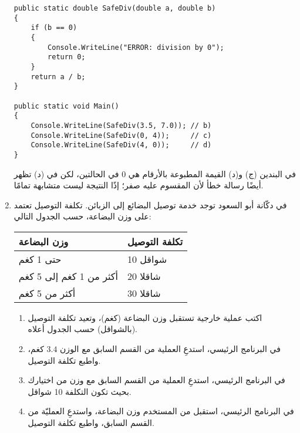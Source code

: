 \documentclass[14pt]{extarticle}
\begin{document}
\begin{enumerate}[itemsep=3em]
\ifwithsols
\begin{boxSolution}
\begin{english}
\begin{verbatim}
public static double SafeDiv(double a, double b)
{
    if (b == 0)
    {
        Console.WriteLine("ERROR: division by 0");
        return 0;
    }
    return a / b;
}

public static void Main()
{
    Console.WriteLine(SafeDiv(3.5, 7.0)); // b)
    Console.WriteLine(SafeDiv(0, 4));     // c)
    Console.WriteLine(SafeDiv(4, 0));     // d)
}
\end{verbatim}
\end{english}
\par
في البندين (ج) و(د) القيمة المطبوعة بالأرقام هي 0 في الحالتين، لكن في (د) تظهر أيضًا رسالة خطأ لأن المقسوم عليه صفر؛ إذًا النتيجة ليست متشابهة تمامًا.
\end{boxSolution}
\fi

\clearpage
\item
في دكّانة أبو السعود توجد خدمة توصيل البضائع إلى الزبائن. تكلفة التوصيل تعتمد على وزن البضاعة، حسب الجدول التالي:

\begin{center}
\renewcommand{\arraystretch}{1.3}
\begin{tabular}{|C{5cm}|C{5cm}|}
\hline
\large{\textbf{وزن البضاعة}} & \large{\textbf{تكلفة التوصيل}} \\[0.3cm] \hline
حتى 1 كغم & 10 شواقل \\ \hline
أكثر من 1 كغم إلى 5 كغم & 20 شاقلا \\ \hline
أكثر من 5 كغم & 30 شاقلا \\ \hline
\end{tabular}
\end{center}

\begin{enumerate}
\item اكتب عملية خارجية تستقبل وزن البضاعة (كغم)، وتعيد تكلفة التوصيل (بالشواقل) حسب الجدول أعلاه.
\item في البرنامج الرئيسي، استدعِ العملية من القسم السابق مع الوزن $3.4$ كغم، واطبع تكلفة التوصيل.
\item في البرنامج الرئيسي، استدعِ العملية من القسم السابق مع وزن من اختيارك بحيث تكون التكلفة 10 شواقل.
\item في البرنامج الرئيسي، استقبل من المستخدم وزن البضاعة، واستدعِ العمليّة من القسم السابق، واطبع تكلفة التوصيل.
\end{enumerate}


\end{enumerate}
\end{document}
